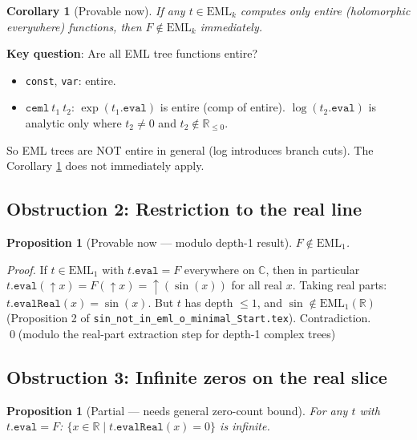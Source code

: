 \documentclass[12pt]{article}
\newtheorem{proposition}[theorem]{Proposition}
\newtheorem{corollary}[theorem]{Corollary}
\begin{document}
\begin{corollary}[\textcolor{proved}{Provable now}]\label{cor:not-holomorphic}
If any $t \in \mathrm{EML}_k$ computes only entire (holomorphic everywhere) functions,
then $F \notin \mathrm{EML}_k$ immediately.
\end{corollary}

\textbf{Key question}: Are all EML tree functions entire?
\begin{itemize}[noitemsep]
  \item \texttt{const}, \texttt{var}: entire.
  \item $\mathtt{ceml}\ t_1\ t_2$: $\exp(t_1.\mathtt{eval})$ is entire (comp of entire).
    $\log(t_2.\mathtt{eval})$ is analytic only where $t_2 \neq 0$ and $t_2 \notin \mathbb{R}_{\leq 0}$.
\end{itemize}

So EML trees are NOT entire in general (log introduces branch cuts).
The Corollary \ref{cor:not-holomorphic} does not immediately apply.

\subsection{Obstruction 2: Restriction to the real line}

\begin{proposition}[\textcolor{proved}{Provable now — modulo depth-1 result}]
$F \notin \mathrm{EML}_1$.
\end{proposition}

\begin{proof}
If $t \in \mathrm{EML}_1$ with $t.\mathtt{eval} = F$ everywhere on $\mathbb{C}$,
then in particular $t.\mathtt{eval}(\uparrow\!x) = F(\uparrow\!x) = \uparrow(\sin(x))$
for all real $x$. Taking real parts: $t.\mathtt{evalReal}(x) = \sin(x)$.
But $t$ has depth $\leq 1$, and $\sin \notin \mathrm{EML}_1(\mathbb{R})$
(Proposition 2 of \texttt{sin\_not\_in\_eml\_o\_minimal\_Start.tex}).
Contradiction. \qed (modulo the real-part extraction step for depth-1 complex trees)
\end{proof}

\subsection{Obstruction 3: Infinite zeros on the real slice}

\begin{proposition}[\textcolor{partial}{Partial — needs general zero-count bound}]
For any $t$ with $t.\mathtt{eval} = F$:
$\{x \in \mathbb{R} \mid t.\mathtt{evalReal}(x) = 0\}$ is infinite.
\end{proposition}
\end{document}
